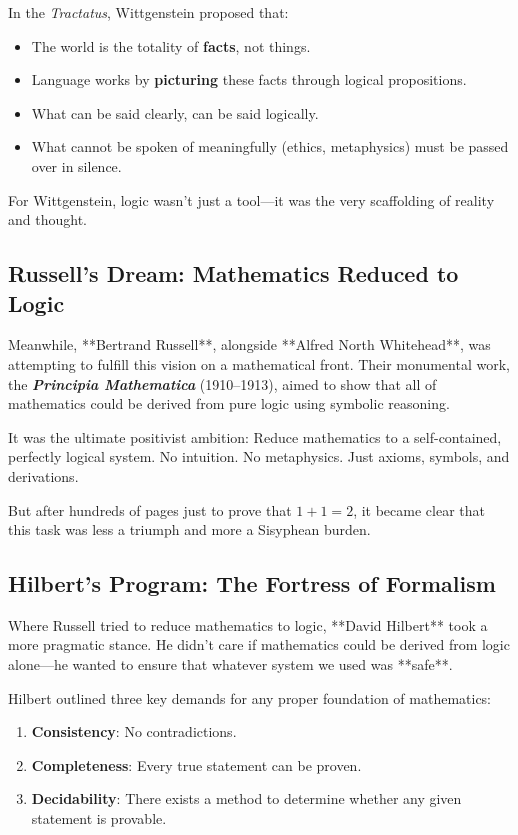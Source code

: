 In the \textit{Tractatus}, Wittgenstein proposed that:

\begin{itemize}
    \item The world is the totality of \textbf{facts}, not things.
    \item Language works by \textbf{picturing} these facts through logical propositions.
    \item What can be said clearly, can be said logically.  
    \item What cannot be spoken of meaningfully (ethics, metaphysics) must be passed over in silence.
\end{itemize}

For Wittgenstein, logic wasn’t just a tool—it was the very scaffolding of reality and thought.

\subsection{Russell’s Dream: Mathematics Reduced to Logic}

Meanwhile, **Bertrand Russell**, alongside **Alfred North Whitehead**, was attempting to fulfill this vision on a mathematical front. Their monumental work, the \textbf{\textit{Principia Mathematica}} (1910–1913), aimed to show that all of mathematics could be derived from pure logic using symbolic reasoning.

It was the ultimate positivist ambition:  
Reduce mathematics to a self-contained, perfectly logical system.  
No intuition. No metaphysics. Just axioms, symbols, and derivations.

But after hundreds of pages just to prove that \( 1 + 1 = 2 \), it became clear that this task was less a triumph and more a Sisyphean burden.

\subsection{Hilbert’s Program: The Fortress of Formalism}

Where Russell tried to reduce mathematics to logic, **David Hilbert** took a more pragmatic stance. He didn’t care if mathematics could be derived from logic alone—he wanted to ensure that whatever system we used was **safe**.

Hilbert outlined three key demands for any proper foundation of mathematics:

\begin{enumerate}
    \item \textbf{Consistency}: No contradictions.
    \item \textbf{Completeness}: Every true statement can be proven.
    \item \textbf{Decidability}: There exists a method to determine whether any given statement is provable.
\end{enumerate}

